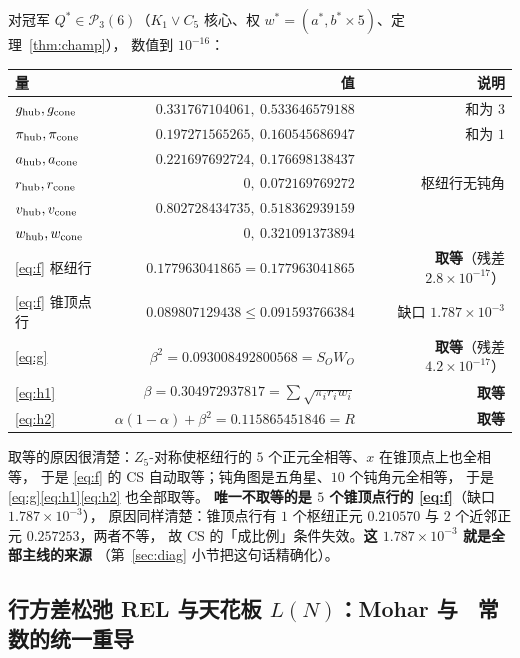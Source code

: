 \begin{remark}\label{rmk:quadtight}
对冠军 $Q^*\in\mathcal P_3(6)$（$K_1\vee C_5$ 核心、权 $w^*=(a^*,b^*\times5)$、定理~\ref{thm:champ}），
数值到 $10^{-16}$：
\begin{center}\small
\begin{tabular}{lrr}
\toprule
量 & 值 & 说明\\
\midrule
$g_{\rm hub},g_{\rm cone}$ & $0.331767104061,\ 0.533646579188$ & 和为 $3$\\
$\pi_{\rm hub},\pi_{\rm cone}$ & $0.197271565265,\ 0.160545686947$ & 和为 $1$\\
$a_{\rm hub},a_{\rm cone}$ & $0.221697692724,\ 0.176698138437$ & \\
$r_{\rm hub},r_{\rm cone}$ & $0,\ 0.072169769272$ & 枢纽行无钝角\\
$v_{\rm hub},v_{\rm cone}$ & $0.802728434735,\ 0.518362939159$ & \\
$w_{\rm hub},w_{\rm cone}$ & $0,\ 0.321091373894$ & \\
\midrule
\eqref{eq:f} 枢纽行 & $0.177963041865=0.177963041865$ & \textbf{取等}（残差 $2.8\times10^{-17}$）\\
\eqref{eq:f} 锥顶点行 & $0.089807129438\le0.091593766384$ & 缺口 $1.787\times10^{-3}$\\
\eqref{eq:g} & $\beta^2=0.093008492800568=S_OW_O$ & \textbf{取等}（残差 $4.2\times10^{-17}$）\\
\eqref{eq:h1} & $\beta=0.304972937817=\sum\sqrt{\pi_ir_iw_i}$ & \textbf{取等}\\
\eqref{eq:h2} & $\alpha(1-\alpha)+\beta^2=0.115865451846=R$ & \textbf{取等}\\
\bottomrule
\end{tabular}
\end{center}
取等的原因很清楚：$Z_5$-对称使枢纽行的 $5$ 个正元全相等、$x$ 在锥顶点上也全相等，
于是 \eqref{eq:f} 的 CS 自动取等；钝角图是五角星、$10$ 个钝角元全相等，
于是 \eqref{eq:g}\eqref{eq:h1}\eqref{eq:h2} 也全部取等。
\textbf{唯一不取等的是 $5$ 个锥顶点行的 \eqref{eq:f}}（缺口 $1.787\times10^{-3}$），
原因同样清楚：锥顶点行有 $1$ 个枢纽正元 $0.210570$ 与 $2$ 个近邻正元 $0.257253$，两者不等，
故 CS 的「成比例」条件失效。\textbf{这 $1.787\times10^{-3}$ 就是全部主线的来源}
（第~\ref{sec:diag} 小节把这句话精确化）。
\end{remark}

\subsection{行方差松弛 REL 与天花板 $L(N)$：Mohar 与 \STW\ 常数的统一重导}\label{sec:relax}


